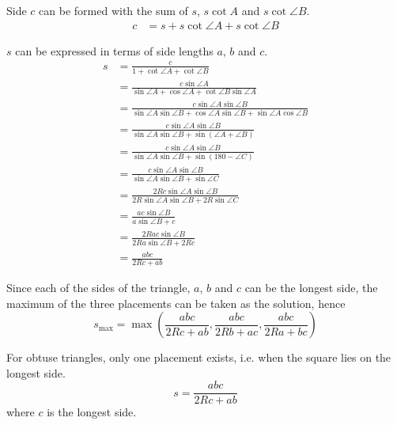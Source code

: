 \documentclass[12pt]{scrartcl}
\begin{document}
Side $c$ can be formed with the sum of $s$, $s \cot A$ and $s \cot \angle{B}$.
\begin{align*}
	c & = s+s\cot \angle{A}+s\cot \angle{B}
\end{align*}

$s$ can be expressed in terms of side lengths $a$, $b$ and $c$.
\begin{align*}
	s & = \frac{c}{1+\cot \angle{A}+\cot \angle{B}}                                                                            \\
	  & = \frac{c \sin\angle{A}}{\sin\angle{A}+\cos\angle{A}+\cot\angle{B}\sin\angle{A}}                                       \\
	  & = \frac{c\sin\angle{A}\sin\angle{B}}{\sin\angle{A}\sin\angle{B}+\cos\angle{A}\sin\angle{B}+\sin\angle{A}\cos\angle{B}} \\
	  & = \frac{c\sin\angle{A}\sin\angle{B}}{\sin\angle{A}\sin\angle{B}+\sin\left(\angle{A}+\angle{B}\right)}                  \\
	  & = \frac{c\sin\angle{A}\sin\angle{B}}{\sin\angle{A}\sin\angle{B}+\sin\left(180-\angle C\right)}                         \\
	  & = \frac{c\sin\angle{A}\sin\angle{B}}{\sin\angle{A}\sin\angle{B}+\sin \angle C}                                         \\
	  & = \frac{2Rc\sin\angle{A}\sin\angle{B}}{2R\sin\angle{A}\sin \angle{B}+2R\sin \angle C}                                  \\
	  & = \frac{ac\sin\angle{B}}{a\sin\angle{B}+c}                                                                             \\
	  & = \frac{2Rac\sin\angle{B}}{2Ra\sin\angle{B}+2Rc}                                                                       \\
	  & = \frac{abc}{2Rc+ab}
\end{align*}

Since each of the sides of the triangle, $a$, $b$ and $c$ can be the longest side,
the maximum of the three placements can be taken as the solution, hence
\begin{equation}
	s_{\text{max}} = \max\left(\dfrac{abc}{2Rc+ab},\dfrac{abc}{2Rb+ac},\dfrac{abc}{2Ra+bc}\right)
\end{equation}

For obtuse triangles, only one placement exists, i.e. when the square lies on the longest side.
\begin{equation}
	s = \dfrac{abc}{2Rc+ab}
\end{equation}
where $c$ is the longest side.
\end{document}

